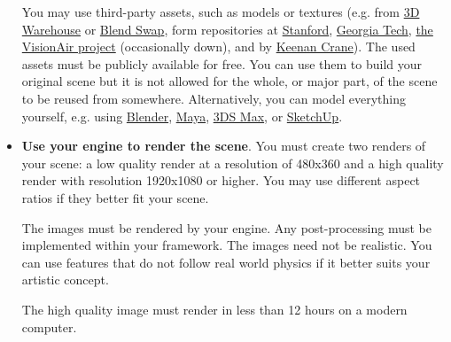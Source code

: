 \documentclass[addpoints]{exam}
\begin{document}
\begin{questions}
\begin{itemize}
    You may use third-party assets, such as models or textures (e.g. from \href{https://3dwarehouse.sketchup.com}{3D Warehouse} or \href{https://www.blendswap.com}{Blend Swap}, form repositories at \href{http://graphics.stanford.edu/data/3Dscanrep/}{Stanford}, \href{https://www.cc.gatech.edu/projects/large_models/}{Georgia Tech}, \href{http://visionair.ge.imati.cnr.it/ontologies/shapes/viewmodels.jsp}{the VisionAir project} (occasionally down), and by \href{https://www.cs.cmu.edu/~kmcrane/Projects/ModelRepository/}{Keenan Crane}). The used assets must be publicly available for free. You can use them to build your original scene but it is not allowed for the whole, or major part, of the scene to be reused from somewhere. Alternatively, you can model everything yourself, e.g. using \href{https://www.blender.org}{Blender}, \href{https://www.autodesk.com/products/maya/overview}{Maya}, \href{https://www.autodesk.com/products/3ds-max/overview}{3DS Max}, or \href{https://www.sketchup.com}{SketchUp}.

  \item \textbf{Use your engine to render the scene}. You must create two renders of your scene: a low quality render at a resolution of 480x360 and a high quality render with resolution 1920x1080 or higher. You may use different aspect ratios if they better fit your scene.
    
    The images must be rendered by your engine. Any post-processing must be implemented within your framework. The images need not be realistic. You can use features that do not follow real world physics if it better suits your artistic concept.
    
    The high quality image must render in less than 12 hours on a modern computer.


\end{itemize}
\end{questions}
\end{document}
